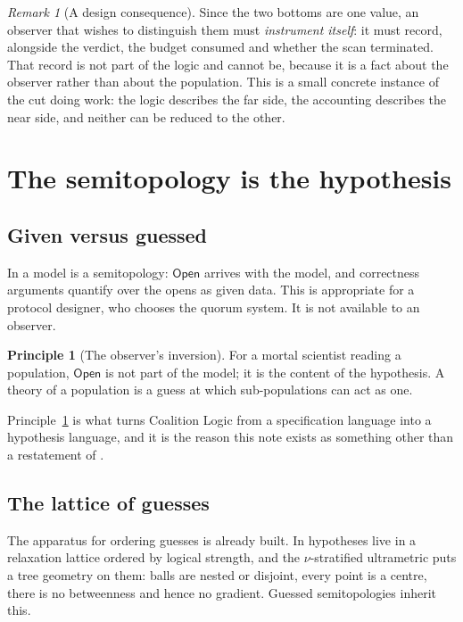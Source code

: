 \documentclass[11pt,a4paper]{article}
\theoremstyle{plain}
\theoremstyle{definition}
\newtheorem{principle}[theorem]{Principle}
\theoremstyle{remark}
\newtheorem{remark}[theorem]{Remark}
\newcommand{\Open}{\mathsf{Open}}
\begin{document}
\begin{remark}[A design consequence]
Since the two bottoms are one value, an observer that wishes to distinguish
them must \emph{instrument itself}: it must record, alongside the verdict, the
budget consumed and whether the scan terminated. That record is not part of the
logic and cannot be, because it is a fact about the observer rather than about
the population. This is a small concrete instance of the cut doing work: the
logic describes the far side, the accounting describes the near side, and
neither can be reduced to the other.
\end{remark}

\section{The semitopology is the hypothesis}\label{sec:hypothesis}

\subsection{Given versus guessed}

In \cite{GZ25,consensus} a model is a semitopology: $\Open$ arrives with the
model, and correctness arguments quantify over the opens as given data. This is
appropriate for a protocol designer, who chooses the quorum system. It is not
available to an observer.

\begin{principle}[The observer's inversion]\label{prin:inversion}
For a mortal scientist reading a population, $\Open$ is not part of the model;
it is the content of the hypothesis. A theory of a population is a guess at
which sub-populations can act as one.
\end{principle}

Principle~\ref{prin:inversion} is what turns Coalition Logic from a
specification language into a hypothesis language, and it is the reason this
note exists as something other than a restatement of \cite{consensus}.

\subsection{The lattice of guesses}

The apparatus for ordering guesses is already built. In \cite[\S5--6]{scientist}
hypotheses live in a relaxation lattice ordered by logical strength, and the
$\nu$-stratified ultrametric puts a tree geometry on them: balls are nested or
disjoint, every point is a centre, there is no betweenness and hence no
gradient. Guessed semitopologies inherit this.
\end{document}
